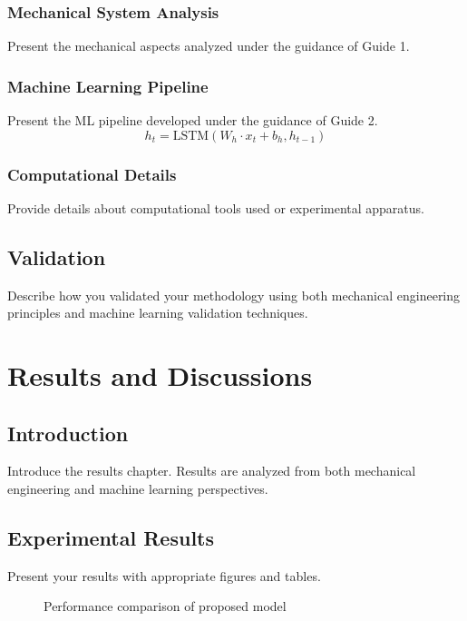 \documentclass[12pt,a4paper]{report}
\newcommand{\guideIname}{Guide 1}
\newcommand{\guideIIname}{Guide 2}
\begin{document}
\subsection{Mechanical System Analysis}
Present the mechanical aspects analyzed under the guidance of \guideIname.

\subsection{Machine Learning Pipeline}
Present the ML pipeline developed under the guidance of \guideIIname.
\begin{equation}
h_t = \text{LSTM}(W_h \cdot x_t + b_h, h_{t-1})
\label{eq:lstm}
\end{equation}

\subsection{Computational Details}
Provide details about computational tools used or experimental apparatus.

\section{Validation}
Describe how you validated your methodology using both mechanical engineering principles and machine learning validation techniques.

\chapter{Results and Discussions}
\label{ch:results}

\section{Introduction}
Introduce the results chapter.
Results are analyzed from both mechanical engineering and machine learning perspectives.

\section{Experimental Results}
Present your results with appropriate figures and tables.
\begin{figure}[h]
\centering
\caption{Performance comparison of proposed model}
\label{fig:result1}
\end{figure}
\end{document}

